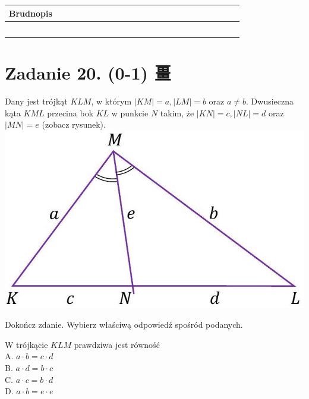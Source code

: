 \documentclass[10pt]{article}
\begin{document}
\begin{center}
\begin{tabular}{|c|c|c|c|c|c|c|c|c|c|c|c|c|c|c|c|c|c|c|c|c|c|c|c|c|c|c|}
\hline
\multicolumn{5}{|l|}{Brudnopis} &  &  &  &  &  &  &  &  &  &  &  &  &  &  &  &  &  &  &  &  &  &  \\
\hline
 &  &  &  &  &  &  &  &  &  &  &  &  &  &  &  &  &  &  &  &  &  &  &  &  &  &  \\
\hline
 &  &  &  &  &  &  &  &  &  &  &  &  &  &  &  &  &  &  &  &  &  &  &  &  &  &  \\
\hline
 &  &  &  &  &  &  &  &  &  &  &  &  &  &  &  &  &  &  &  &  &  &  &  &  &  &  \\
\hline
 &  &  &  &  &  &  &  &  &  &  &  &  &  &  &  &  &  &  &  &  &  &  &  &  &  &  \\
\hline
 &  &  &  &  &  &  &  &  &  &  &  &  &  &  &  &  &  &  &  &  &  &  &  &  &  &  \\
\hline
\end{tabular}
\end{center}

\section*{Zadanie 20. (0-1) 畺}
Dany jest trójkąt \(K L M\), w którym \(|K M|=a,|L M|=b\) oraz \(a \neq b\). Dwusieczna kąta \(K M L\) przecina bok \(K L\) w punkcie \(N\) takim, że \(|K N|=c,|N L|=d\) oraz \(|M N|=e\) (zobacz rysunek).\\
\includegraphics[max width=\textwidth, center]{2024_11_21_daeb5e5efb43dd4cb535g-19(1)}

Dokończ zdanie. Wybierz właściwą odpowiedź spośród podanych.

W trójkącie \(K L M\) prawdziwa jest równość\\
A. \(a \cdot b=c \cdot d\)\\
B. \(a \cdot d=b \cdot c\)\\
C. \(a \cdot c=b \cdot d\)\\
D. \(a \cdot b=e \cdot e\)
\end{document}

